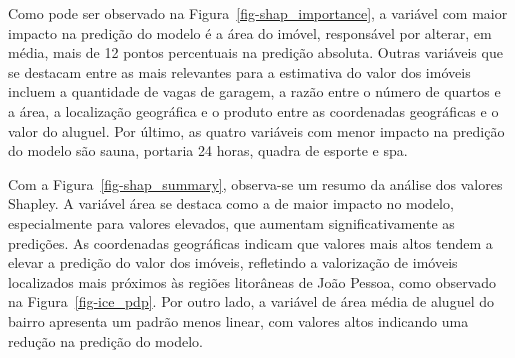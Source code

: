 \documentclass[
  12pt,
  a4paper,
]{scrreprt}
\begin{document}
\vspace{12pt}

Como pode ser observado na Figura~\ref{fig-shap_importance}, a variável
com maior impacto na predição do modelo é a área do imóvel, responsável
por alterar, em média, mais de 12 pontos percentuais na predição
absoluta. Outras variáveis que se destacam entre as mais relevantes para
a estimativa do valor dos imóveis incluem a quantidade de vagas de
garagem, a razão entre o número de quartos e a área, a localização
geográfica e o produto entre as coordenadas geográficas e o valor do
aluguel. Por último, as quatro variáveis com menor impacto na predição
do modelo são sauna, portaria 24 horas, quadra de esporte e spa.

\vspace{12pt}

Com a Figura~\ref{fig-shap_summary}, observa-se um resumo da análise dos
valores Shapley. A variável área se destaca como a de maior impacto no
modelo, especialmente para valores elevados, que aumentam
significativamente as predições. As coordenadas geográficas indicam que
valores mais altos tendem a elevar a predição do valor dos imóveis,
refletindo a valorização de imóveis localizados mais próximos às regiões
litorâneas de João Pessoa, como observado na Figura~\ref{fig-ice_pdp}.
Por outro lado, a variável de área média de aluguel do bairro apresenta
um padrão menos linear, com valores altos indicando uma redução na
predição do modelo.
\end{document}
